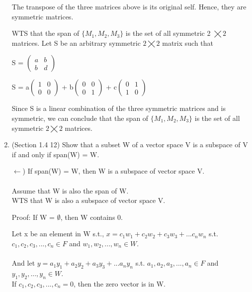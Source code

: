 \documentclass[12pt]{article}
\begin{document}
\begin{enumerate}
    The transpose of the three matrices above is its original self. Hence, they are symmetric matrices. 

    WTS that the span of $\{M_1, M_2, M_3\}$  is the set of all symmetric 2 $\bigtimes 2$ matrices.
    Let S be an arbitrary symmetric $2 \bigtimes 2$ matrix such that
    
    S = $\begin{pmatrix}
    a & b \\
    b & d 
    \end{pmatrix}$

    S = a$\begin{pmatrix}
    1 & 0 \\
    0 & 0 
    \end{pmatrix}$ + b$\begin{pmatrix}
    0 & 0 \\
    0 & 1 
    \end{pmatrix}$ + c$\begin{pmatrix}
    0 & 1 \\
    1 & 0 
    \end{pmatrix}$

    Since S is a linear combination of the three symmetric matrices and is symmetric, we can conclude that the span of $\{M_1, M_2, M_3\}$ is the set of all symmetric $2 \bigtimes 2$ matrices. \qedsymbol{}

    \item (Section 1.4 12) Show that a subset W of a vector space V is a subspace of V if and only if span(W) = W. 
    
    $\leftarrow$) If span(W) = W, then W is a subspace of vector space V. \\ \\
    Assume that W is also the span of W. \\
    WTS that W is also a subspace of vector space V. 

    Proof: If W = ${\emptyset}$, then W contains 0. 

    Let x be an element in W s.t., $x = c_1w_1 + c_2w_2 + c_3w_3 + ... c_nw_n$ s.t. $c_1, c_2, c_3, ..., c_n \in F$ and $w_1, w_2, ..., w_n \in W$. \\ \\ And let $y = a_1y_1 + a_2y_2 + a_3y_3 + ... a_ny_n$ s.t. $a_1, a_2, a_3, ..., a_n \in F$ and $y_1, y_2, ..., y_n \in W$. \\

    If $c_1, c_2, c_3,..., c_n = 0$, then the zero vector is in W. 


\end{enumerate}
\end{document}
